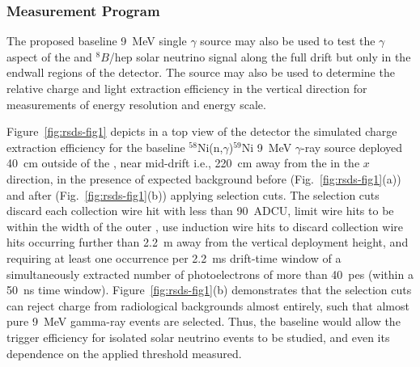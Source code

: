 \subsubsection{Measurement Program}
\label{sec:sp-calib-sys-src-dep-meas}

The proposed baseline 9~MeV single $\gamma$ source may also be used to test the $\gamma$ aspect of the  and $^{8}B$/hep solar neutrino signal along the full drift but only in the endwall regions of the detector. The source may also be used to determine the relative charge and light extraction efficiency in the vertical direction for measurements of energy resolution and energy scale. 

Figure~\ref{fig:rsds-fig1}
depicts in a top view of the detector the simulated charge extraction efficiency for the baseline $^{58}$Ni(n,$\gamma$)$^{59}$Ni 9~MeV $\gamma$-ray source deployed \SI{40}{\cm} outside of the , near mid-drift i.e., \SI{220}{\cm} away from the  in the $x$ direction, in the presence of expected background before (Fig.~\ref{fig:rsds-fig1}(a)) and after (Fig.~\ref{fig:rsds-fig1}(b)) applying selection cuts. The selection cuts discard each collection wire hit with less than 90~ADCU, limit wire hits to be within the width of the outer , use induction wire hits to discard collection wire hits occurring further than \SI{2.2}{\m} away from the vertical deployment height, and requiring at least one occurrence per \SI{2.2}{\ms} drift-time window of a simultaneously extracted number of photoelectrons of more than 40~pes (within a \SI{50}{\ns} time window).
Figure~\ref{fig:rsds-fig1}(b)
demonstrates that the selection cuts can reject charge from radiological backgrounds almost entirely, such that almost pure 9~MeV gamma-ray events are selected. Thus, the baseline  would allow the trigger efficiency for isolated solar neutrino events to be studied, and even its dependence on the applied threshold measured. 


